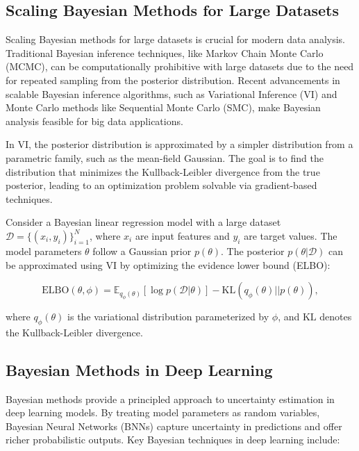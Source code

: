 \documentclass[12pt]{book} %
\begin{document}
\subsection{Scaling Bayesian Methods for Large Datasets}
Scaling Bayesian methods for large datasets is crucial for modern data analysis. Traditional Bayesian inference techniques, like Markov Chain Monte Carlo (MCMC), can be computationally prohibitive with large datasets due to the need for repeated sampling from the posterior distribution. Recent advancements in scalable Bayesian inference algorithms, such as Variational Inference (VI) and Monte Carlo methods like Sequential Monte Carlo (SMC), make Bayesian analysis feasible for big data applications.

In VI, the posterior distribution is approximated by a simpler distribution from a parametric family, such as the mean-field Gaussian. The goal is to find the distribution that minimizes the Kullback-Leibler divergence from the true posterior, leading to an optimization problem solvable via gradient-based techniques.

Consider a Bayesian linear regression model with a large dataset \( \mathcal{D} = \{(x_i, y_i)\}_{i=1}^N \), where \( x_i \) are input features and \( y_i \) are target values. The model parameters \( \theta \) follow a Gaussian prior \( p(\theta) \). The posterior \( p(\theta | \mathcal{D}) \) can be approximated using VI by optimizing the evidence lower bound (ELBO):

\[
\text{ELBO}(\theta, \phi) = \mathbb{E}_{q_{\phi}(\theta)}[\log p(\mathcal{D} | \theta)] - \text{KL}(q_{\phi}(\theta) || p(\theta)),
\]

where \( q_{\phi}(\theta) \) is the variational distribution parameterized by \( \phi \), and \( \text{KL} \) denotes the Kullback-Leibler divergence.

\subsection{Bayesian Methods in Deep Learning}
Bayesian methods provide a principled approach to uncertainty estimation in deep learning models. By treating model parameters as random variables, Bayesian Neural Networks (BNNs) capture uncertainty in predictions and offer richer probabilistic outputs. Key Bayesian techniques in deep learning include:
\end{document}
